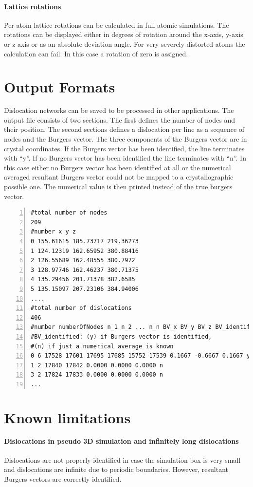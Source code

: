\documentclass[a4paper,12pt]{scrartcl}
\begin{document}
\paragraph{Lattice rotations}
Per atom lattice rotations can be calculated in full atomic simulations. The rotations can be displayed either in degrees of rotation around the x-axis, y-axis or z-axis or as an absolute deviation angle.
For very severely distorted atoms the calculation can fail. In this case a rotation of zero is assigned.

\section{Output Formats}
Dislocation networks can be saved to be processed in other applications.
The output file consists of two sections. The first defines the number of nodes and their position. The second sections defines a dislocation per line as a sequence of nodes and the Burgers vector.
The three components of the Burgers vector are in crystal coordinates. If the Burgers vector has been identified, the line terminates with ``y''. If no Burgers vector has been identified the line terminates with ``n''. In this case either no Burgers vector has been identified at all or the numerical averaged resultant Burgers vector could not be mapped to a crystallographic possible one. The numerical value is then printed instead of the true burgers vector.

\begin{Verbatim}[frame=single, samepage=true, numbers = left]
#total number of nodes
209
#number x y z
0 155.61615 185.73717 219.36273
1 124.12319 162.65952 380.88416
2 126.55689 162.48555 380.7972
3 128.97746 162.46237 380.71375
4 135.29456 201.71378 382.6585
5 135.15097 207.23106 384.94006
....
#total number of dislocations
406
#number numberOfNodes n_1 n_2 ... n_n BV_x BV_y BV_z BV_identified
#BV_identified: (y) if Burgers vector is identified,
#(n) if just a numerical average is known
0 6 17528 17601 17695 17685 15752 17539 0.1667 -0.6667 0.1667 y
1 2 17840 17842 0.0000 0.0000 0.0000 n
3 2 17824 17833 0.0000 0.0000 0.0000 n
...
\end{Verbatim}


\section{Known limitations}
\paragraph{Dislocations in pseudo 3D simulation and infinitely long dislocations}
Dislocations are not properly identified in case the simulation box is very small and dislocations are infinite due to periodic boundaries. However, resultant Burgers vectors are correctly identified.
\end{document}
